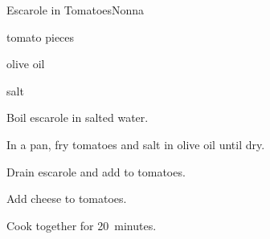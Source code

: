 \begin{recipe}{Escarole in Tomatoes}{Nonna}{}

\begin{ingredients}
\item {}
\item tomato pieces
\item olive oil
\item salt
\item {}
\end{ingredients}

\begin{directions}
\item Boil escarole in salted water.
\item In a pan, fry tomatoes and salt in olive oil until dry.
\item Drain escarole and add to tomatoes.
\item Add cheese to tomatoes.
\item Cook together for 20~minutes.
\end{directions}

\end{recipe}
